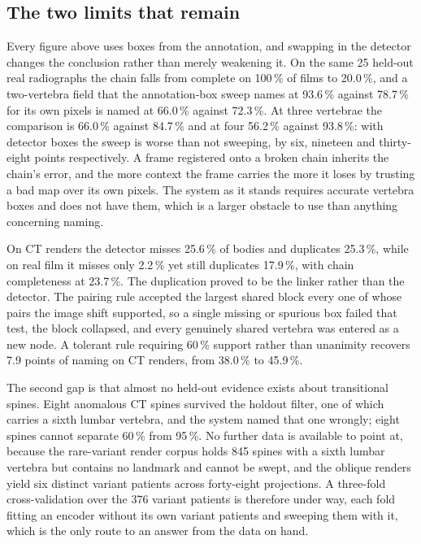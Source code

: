 \documentclass[11pt,letterpaper]{article}
\begin{document}
\subsection*{The two limits that remain}
Every figure above uses boxes from the annotation, and swapping in the detector changes the conclusion rather than merely weakening it. On the same 25 held-out real radiographs the chain falls from complete on 100\,\% of films to 20.0\,\%, and a two-vertebra field that the annotation-box sweep names at 93.6\,\% against 78.7\,\% for its own pixels is named at 66.0\,\% against 72.3\,\%. At three vertebrae the comparison is 66.0\,\% against 84.7\,\% and at four 56.2\,\% against 93.8\,\%: with detector boxes the sweep is worse than not sweeping, by six, nineteen and thirty-eight points respectively. A frame registered onto a broken chain inherits the chain's error, and the more context the frame carries the more it loses by trusting a bad map over its own pixels. The system as it stands requires accurate vertebra boxes and does not have them, which is a larger obstacle to use than anything concerning naming.

On CT renders the detector misses 25.6\,\% of bodies and duplicates 25.3\,\%, while on real film it misses only 2.2\,\% yet still duplicates 17.9\,\%, with chain completeness at 23.7\,\%. The duplication proved to be the linker rather than the detector. The pairing rule accepted the largest shared block every one of whose pairs the image shift supported, so a single missing or spurious box failed that test, the block collapsed, and every genuinely shared vertebra was entered as a new node. A tolerant rule requiring 60\,\% support rather than unanimity recovers 7.9 points of naming on CT renders, from 38.0\,\% to 45.9\,\%.

The second gap is that almost no held-out evidence exists about transitional spines. Eight anomalous CT spines survived the holdout filter, one of which carries a sixth lumbar vertebra, and the system named that one wrongly; eight spines cannot separate 60\,\% from 95\,\%. No further data is available to point at, because the rare-variant render corpus holds 845 spines with a sixth lumbar vertebra but contains no landmark and cannot be swept, and the oblique renders yield six distinct variant patients across forty-eight projections. A three-fold cross-validation over the 376 variant patients is therefore under way, each fold fitting an encoder without its own variant patients and sweeping them with it, which is the only route to an answer from the data on hand.
\end{document}
